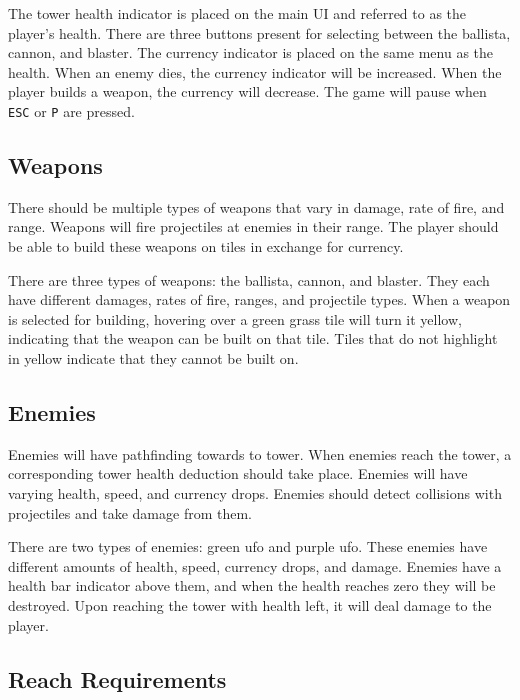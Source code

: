 \documentclass{article}
\begin{document}
The tower health indicator is placed on the main UI and referred to as the player's health. There are three buttons present for selecting between the ballista, cannon, and blaster. The currency indicator is placed on the same menu as the health. When an enemy dies, the currency indicator will be increased. When the player builds a weapon, the currency will decrease. The game will pause when \lstinline{ESC} or \lstinline{P} are pressed.

\subsection{Weapons}

\begin{displayquote}
    \small
    There should be multiple types of weapons that vary in damage, rate of fire, and range. Weapons will fire projectiles at enemies in their range. The player should be able to build these weapons on tiles in exchange for currency.
\end{displayquote}

There are three types of weapons: the ballista, cannon, and blaster. They each have different damages, rates of fire, ranges, and projectile types. When a weapon is selected for building, hovering over a green grass tile will turn it yellow, indicating that the weapon can be built on that tile. Tiles that do not highlight in yellow indicate that they cannot be built on.

\subsection{Enemies}

\begin{displayquote}
    \small
    Enemies will have pathfinding towards to tower. When enemies reach the tower, a corresponding tower health deduction should take place. Enemies will have varying health, speed, and currency drops. Enemies should detect collisions with projectiles and take damage from them.
\end{displayquote}

There are two types of enemies: green ufo and purple ufo. These enemies have different amounts of health, speed, currency drops, and damage. Enemies have a health bar indicator above them, and when the health reaches zero they will be destroyed. Upon reaching the tower with health left, it will deal damage to the player.

\subsection{Reach Requirements}
\end{document}
